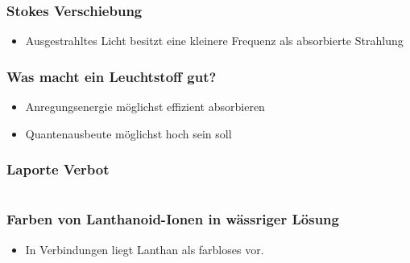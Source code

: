 \documentclass{beamer}
\begin{document}
\begin{frame}
  \frametitle{Stokes Verschiebung}
    \begin{itemize}
    \item Ausgestrahltes Licht besitzt eine kleinere Frequenz als absorbierte Strahlung   
    \end{itemize}
  \end{frame}


\begin{frame}[t]\frametitle{Was macht ein Leuchtstoff gut?}
\begin{itemize}
 \item Anregungsenergie möglichst effizient absorbieren 
 \item Quantenausbeute möglichst hoch sein soll
\end{itemize}  
\end{frame}

  \begin{frame}[t]\frametitle{Laporte Verbot}
 
\end{frame}
\section{}
  \begin{frame}[t]\frametitle{Farben von Lanthanoid-Ionen in wässriger Lösung}
\begin{itemize}
  \item In Verbindungen liegt Lanthan als farbloses  vor.
\end{itemize}

\end{frame}
\end{document}

